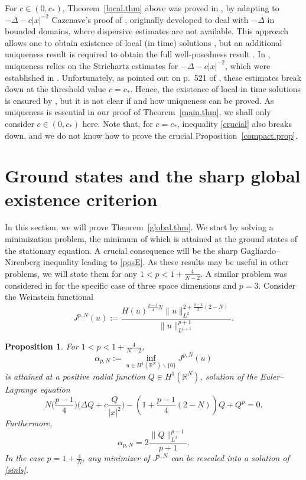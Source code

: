 \documentclass[reqno]{amsart}
\newcommand{\real}{\mathbb{R}}
\newcommand{\rn}{\real^N}
\theoremstyle{plain}
\newtheorem{proposition}{Proposition}
\theoremstyle{definition}
\numberwithin{equation}{section}
\begin{document}
For $c\in(0,c_*)$, Theorem~\ref{local.thm} above was proved in \cite{suzuki}, 
by adapting to $-\Delta-c|x|^{-2}$ Cazenave's proof of \cite[Theorems~3.3.9]{cazenave}, 
originally developed to deal with $-\Delta$ in bounded domains, 
where dispersive estimates are not available. 
This approach allows one to obtain existence of local (in time) solutions \cite[Theorems~3.3.5]{cazenave}, 
but an additional uniqueness result is required to obtain the full well-posedness result
\cite[Theorems~3.3.9]{cazenave}. In \cite{suzuki}, uniqueness relies on the Strichartz
estimates for $-\Delta-c|x|^{-2}$, which were established in \cite{burq}.
Unfortunately, as pointed out on p.~521 of \cite{burq}, 
these estimates break down at the threshold value $c=c_*$. 
Hence, the existence of local in time solutions is
ensured by \cite{suzuki}, but it is not clear if and how uniqueness can be proved.
As uniqueness is essential in our proof of Theorem~\ref{main.thm},
we shall only consider $c\in(0,c_*)$ here. Note that, for $c=c_*$, inequality \eqref{crucial} also
breaks down, and we do not know how to prove the crucial Proposition~\ref{compact.prop}.


\section{Ground states and the sharp global existence criterion}\label{global.sec}

In this section, we will prove Theorem~\ref{global.thm}.
We start by solving a minimization problem, the minimum of which is
attained at the ground states of the stationary equation. 
A crucial consequence will be the sharp Gagliardo--Nirenberg inequality leading to \eqref{posE}.
As these results may be useful in other problems, we will state them for any $1<p<1+\frac{4}{N-2}$. 
A similar problem was considered in \cite{visan2} for the specific case of three space dimensions and $p=3$.
Consider the Weinstein functional
\[
J^{p,N}(u):=\frac{H(u)^{\frac{p-1}{4}N}\|u\|^{2+\frac{p-1}{2}(2-N)}_{L^2}}{\|u\|^{p+1}_{L^{p+1}}}.
\]
 
\begin{proposition}\label{minimization.prop}
 For $1<p<1+\frac{4}{N-2}$,
\[
\alpha_{p,N} := \inf_{u\in H^1(\rn)\backslash\{0\}} J^{p,N}(u)
\]
is attained at a positive radial function $Q\in H^1(\rn)$, solution of the Euler--Lagrange equation
\begin{equation}\label{EL}
N\Big(\frac{p-1}{4}\Big)\Big(\Delta Q +c\frac{Q}{|x|^2}\Big)-\left(1+\frac{p-1}{4}(2-N)\right)Q+Q^p=0.
\end{equation}
Furthermore,
\begin{equation} \label{sharpestimate}
\alpha_{p,N}=2\frac{\|Q\|_{L^2}^{p-1}}{p+1}.
\end{equation}
In the case $p=1+\frac4N$, any minimizer of $J^{p,N}$ can be rescaled into a solution of \eqref{sinls}.
\end{proposition}
\end{document}
